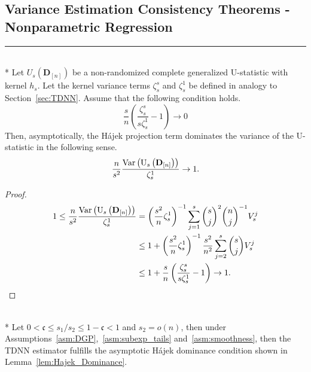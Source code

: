 \subsection{Variance Estimation Consistency Theorems - Nonparametric Regression}
\hrule

\begin{boxD}
    \begin{lem}\label{lem:Hajek_Dominance}\mbox{}\\*
	Let $U_{s}\left(\mathbf{D}_{[n]}\right)$ be a non-randomized complete generalized U-statistic with kernel $h_s$.
	Let the kernel variance terms $\zeta_{s}^{s}$ and $\zeta_{s}^{1}$ be defined in analogy to Section~\ref{sec:TDNN}.
	Assume that the following condition holds.
	\begin{equation}
		\frac{s}{n}\left(\frac{\zeta_{s}^{s}}{s \zeta_{s}^{1}} - 1\right) \rightarrow 0
	\end{equation}
	Then, asymptotically, the H\'ajek projection term dominates the variance of the U-statistic in the following sense.
	\begin{equation}
		\frac{n}{s^2}\frac{\text{Var}\left(\mathrm{U}_{s}\left(\mathbf{D}_{[n]}\right)\right)}{\zeta_{s}^{1}}
		\rightarrow 1.
	\end{equation}
\end{lem}
\end{boxD}

\begin{proof}
	\begin{equation}
		\begin{aligned}
			1 \leq \frac{n}{s^2}\frac{\text{Var}\left(\mathrm{U}_{s}\left(\mathbf{D}_{[n]}\right)\right)}{\zeta_{s}^{1}}
			 & = \left(\frac{s^2}{n} \zeta_{s}^{1}\right)^{-1} \sum_{j=1}^{s}\binom{s}{j}^2\binom{n}{j}^{-1} V_{s}^{j}     \\
			 & \leq 1 + \left(\frac{s^2}{n} \zeta_{s}^{1}\right)^{-1} \frac{s^2}{n^2} \sum_{j=2}^{s}\binom{s}{j} V_{s}^{j} \\
			 & \leq 1 + \frac{s}{n}\left(\frac{\zeta_{s}^{s}}{s\zeta_{s}^{1}} - 1\right)
			\rightarrow 1.
		\end{aligned}
	\end{equation}
\end{proof}

\begin{boxD}
    \begin{lem}\label{lem:TDNN_Hajek_Dominance}\mbox{}\\*
	Let $0 < \mathfrak{c} \leq s_1/s_2 \leq 1 - \mathfrak{c} < 1$ and $s_2 = o(n)$, then under Assumptions~\ref{asm:DGP},~\ref{asm:subexp_tails} and~\ref{asm:smoothness}, then the TDNN estimator fulfills the asymptotic H\'ajek dominance condition shown in Lemma~\ref{lem:Hajek_Dominance}.
\end{lem}
\end{boxD}


